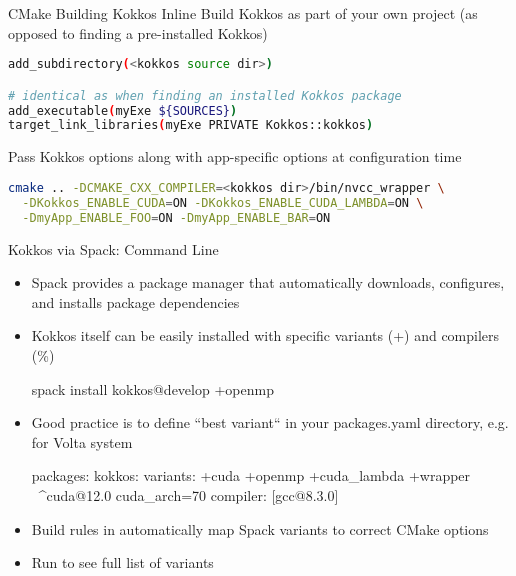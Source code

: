 \begin{frame}[fragile]{CMake Building Kokkos Inline}
Build Kokkos as part of your own project (as opposed to finding a pre-installed Kokkos)
\begin{lstlisting}[language=bash]
add_subdirectory(<kokkos source dir>)

# identical as when finding an installed Kokkos package
add_executable(myExe ${SOURCES})
target_link_libraries(myExe PRIVATE Kokkos::kokkos)
\end{lstlisting}

Pass Kokkos options along with app-specific options at configuration time
\begin{lstlisting}[language=bash]
cmake .. -DCMAKE_CXX_COMPILER=<kokkos dir>/bin/nvcc_wrapper \
  -DKokkos_ENABLE_CUDA=ON -DKokkos_ENABLE_CUDA_LAMBDA=ON \
  -DmyApp_ENABLE_FOO=ON -DmyApp_ENABLE_BAR=ON
\end{lstlisting}

\end{frame}

\begin{frame}[fragile]{Kokkos via Spack: Command Line}
\begin{itemize}
\item Spack provides a package manager that automatically downloads, configures, and installs package dependencies
\item Kokkos itself can be easily installed with specific variants (+) and compilers (\%)
\begin{shell}
spack install kokkos@develop +openmp %
\end{shell}
\item Good practice is to define ``best variant`` in your packages.yaml directory, e.g. for Volta system
\begin{shell}
packages:
   kokkos:
    variants: +cuda +openmp +cuda_lambda +wrapper \
              ^cuda@12.0 cuda_arch=70
    compiler: [gcc@8.3.0]
\end{shell}
\item Build rules in  automatically map Spack variants to correct CMake options
\item Run  to see full list of variants
\end{itemize}
\end{frame}

